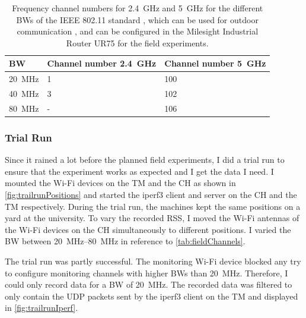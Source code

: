 \begin{table}[H]
	\centering
	\begin{tabular}{>{\centering}p{2cm}p{4cm}p{4cm}}
		\toprule
		\ac{BW} & Channel number \SI{2.4}{\giga\hertz} & Channel number \SI{5}{\giga\hertz}\\
		\midrule
		\SI{20}{\mega\hertz} & \num{1}&
		\num{100} \\
		\SI{40}{\mega\hertz} &
		\num{3}
		& \num{102} \\
		\SI{80}{\mega\hertz} &
		- & \num{106} \\
		\bottomrule
	\end{tabular}
	\caption{Frequency channel numbers for \SI{2.4}{\giga\hertz} and \SI{5}{\giga\hertz} for the different \acf{BW}s of the IEEE 802.11 standard \cite{ieee_standard_2021ax}, which can be used for
	outdoor communication \cite{freq_plan_24G}, \cite{freq_plan_5G} and can be configured in the Milesight Industrial Router UR75 for
	the field experiments.}
	\label{tab:fieldChannels}
\end{table}


\subsubsection*{Trial Run}

Since it rained a lot before the planned field experiments, I did a trial run to ensure that the experiment works as expected
and I get the data I need.
I mounted the Wi-Fi devices on the \ac{TM} and the \ac{CH} as shown in \autoref{fig:trailrunPositions} and
started the iperf3 client and server on the \ac{CH} and the \ac{TM} respectively.
During the trial run, the machines kept the same positions on a yard at the university.
To vary the recorded \ac{RSS}, I moved the Wi-Fi antennas of the Wi-Fi devices on the \ac{CH} simultaneously to
different positions.
I varied the \ac{BW} between \SIrange{20}{80}{\mega\hertz} in reference to \autoref{tab:fieldChannels}.

The trial run was partly successful.
The monitoring Wi-Fi device blocked any try to configure monitoring channels with higher \ac{BW}s than \SI{20}{\mega\hertz}.
Therefore, I could only record data for a \ac{BW} of \SI{20}{\mega\hertz}.
The recorded data was filtered to only contain the \ac{UDP} packets sent by the iperf3 client on the \ac{TM}
and displayed in \autoref{fig:trailrunIperf}.

